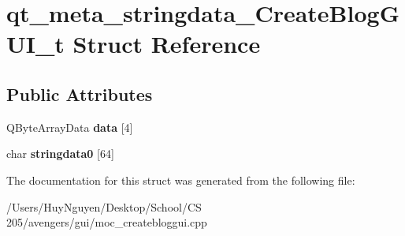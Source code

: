 \hypertarget{structqt__meta__stringdata__CreateBlogGUI__t}{}\section{qt\+\_\+meta\+\_\+stringdata\+\_\+\+Create\+Blog\+G\+U\+I\+\_\+t Struct Reference}
\label{structqt__meta__stringdata__CreateBlogGUI__t}
\subsection*{Public Attributes}
\begin{DoxyCompactItemize}
\item 
Q\+Byte\+Array\+Data {\bfseries data} \mbox{[}4\mbox{]}\hypertarget{structqt__meta__stringdata__CreateBlogGUI__t_ad4943731cf86afca73d76bcd1f5ec2ca}{}\label{structqt__meta__stringdata__CreateBlogGUI__t_ad4943731cf86afca73d76bcd1f5ec2ca}

\item 
char {\bfseries stringdata0} \mbox{[}64\mbox{]}\hypertarget{structqt__meta__stringdata__CreateBlogGUI__t_a61698e4e1b220402ef556d5d89ba70d8}{}\label{structqt__meta__stringdata__CreateBlogGUI__t_a61698e4e1b220402ef556d5d89ba70d8}

\end{DoxyCompactItemize}


The documentation for this struct was generated from the following file\+:\begin{DoxyCompactItemize}
\item 
/\+Users/\+Huy\+Nguyen/\+Desktop/\+School/\+C\+S 205/avengers/gui/moc\+\_\+createbloggui.\+cpp\end{DoxyCompactItemize}
